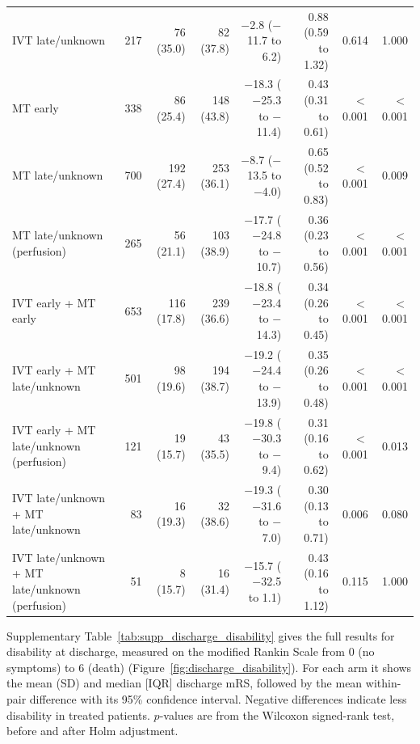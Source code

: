 \begin{landscape}
\begin{longtable}{p{5.6cm}rrrrrrr}
IVT late/unknown & 217 & 76 (35.0) & 82 (37.8) & $-$2.8 ($-$11.7 to 6.2) & 0.88 (0.59 to 1.32) & 0.614 & 1.000 \\
MT early & 338 & 86 (25.4) & 148 (43.8) & $-$18.3 ($-$25.3 to $-$11.4) & 0.43 (0.31 to 0.61) & $<$0.001 & $<$0.001 \\
MT late/unknown & 700 & 192 (27.4) & 253 (36.1) & $-$8.7 ($-$13.5 to $-$4.0) & 0.65 (0.52 to 0.83) & $<$0.001 & 0.009 \\
MT late/unknown (perfusion) & 265 & 56 (21.1) & 103 (38.9) & $-$17.7 ($-$24.8 to $-$10.7) & 0.36 (0.23 to 0.56) & $<$0.001 & $<$0.001 \\
IVT early + MT early & 653 & 116 (17.8) & 239 (36.6) & $-$18.8 ($-$23.4 to $-$14.3) & 0.34 (0.26 to 0.45) & $<$0.001 & $<$0.001 \\
IVT early + MT late/unknown & 501 & 98 (19.6) & 194 (38.7) & $-$19.2 ($-$24.4 to $-$13.9) & 0.35 (0.26 to 0.48) & $<$0.001 & $<$0.001 \\
IVT early + MT late/unknown (perfusion) & 121 & 19 (15.7) & 43 (35.5) & $-$19.8 ($-$30.3 to $-$9.4) & 0.31 (0.16 to 0.62) & $<$0.001 & 0.013 \\
IVT late/unknown + MT late/unknown & 83 & 16 (19.3) & 32 (38.6) & $-$19.3 ($-$31.6 to $-$7.0) & 0.30 (0.13 to 0.71) & 0.006 & 0.080 \\
IVT late/unknown + MT late/unknown (perfusion) & 51 & 8 (15.7) & 16 (31.4) & $-$15.7 ($-$32.5 to 1.1) & 0.43 (0.16 to 1.12) & 0.115 & 1.000 \\
\end{longtable}
\vspace{-0.5\baselineskip}
\clearpage

{\normalsize
Supplementary Table~\ref{tab:supp_discharge_disability} gives the full results for disability at discharge, measured on the modified Rankin Scale from 0 (no symptoms) to 6 (death) (Figure~\ref{fig:discharge_disability}). For each arm it shows the mean (SD) and median [IQR] discharge mRS, followed by the mean within-pair difference with its 95\% confidence interval. Negative differences indicate less disability in treated patients. $p$-values are from the Wilcoxon signed-rank test, before and after Holm adjustment.
\par}
\bigskip


\end{landscape}
